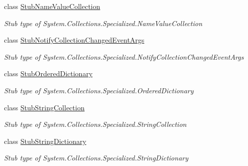\begin{DoxyCompactItemize}
class \hyperlink{class_system_1_1_collections_1_1_specialized_1_1_fakes_1_1_stub_name_value_collection}{Stub\-Name\-Value\-Collection}
\begin{DoxyCompactList}\small\item\em Stub type of System.\-Collections.\-Specialized.\-Name\-Value\-Collection\end{DoxyCompactList}\item 
class \hyperlink{class_system_1_1_collections_1_1_specialized_1_1_fakes_1_1_stub_notify_collection_changed_event_args}{Stub\-Notify\-Collection\-Changed\-Event\-Args}
\begin{DoxyCompactList}\small\item\em Stub type of System.\-Collections.\-Specialized.\-Notify\-Collection\-Changed\-Event\-Args\end{DoxyCompactList}\item 
class \hyperlink{class_system_1_1_collections_1_1_specialized_1_1_fakes_1_1_stub_ordered_dictionary}{Stub\-Ordered\-Dictionary}
\begin{DoxyCompactList}\small\item\em Stub type of System.\-Collections.\-Specialized.\-Ordered\-Dictionary\end{DoxyCompactList}\item 
class \hyperlink{class_system_1_1_collections_1_1_specialized_1_1_fakes_1_1_stub_string_collection}{Stub\-String\-Collection}
\begin{DoxyCompactList}\small\item\em Stub type of System.\-Collections.\-Specialized.\-String\-Collection\end{DoxyCompactList}\item 
class \hyperlink{class_system_1_1_collections_1_1_specialized_1_1_fakes_1_1_stub_string_dictionary}{Stub\-String\-Dictionary}
\begin{DoxyCompactList}\small\item\em Stub type of System.\-Collections.\-Specialized.\-String\-Dictionary\end{DoxyCompactList}\end{DoxyCompactItemize}
